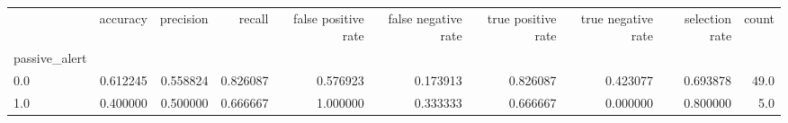 \begin{tabular}{lrrrrrrrrr}
\toprule
{} &  accuracy &  precision &    recall &  false positive rate &  false negative rate &  true positive rate &  true negative rate &  selection rate &  count \\
passive\_alert &           &            &           &                      &                      &                     &                     &                 &        \\
\midrule
0.0           &  0.612245 &   0.558824 &  0.826087 &             0.576923 &             0.173913 &            0.826087 &            0.423077 &        0.693878 &   49.0 \\
1.0           &  0.400000 &   0.500000 &  0.666667 &             1.000000 &             0.333333 &            0.666667 &            0.000000 &        0.800000 &    5.0 \\
\bottomrule
\end{tabular}
